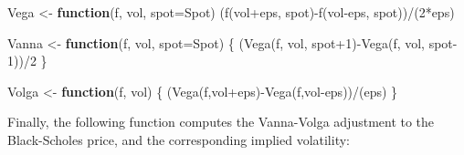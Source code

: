 \documentclass[]{tufte-book}
\newenvironment{Shaded}{}{}
\newcommand{\AttributeTok}[1]{\textcolor[rgb]{0.49,0.56,0.16}{#1}}
\newcommand{\ControlFlowTok}[1]{\textcolor[rgb]{0.00,0.44,0.13}{\textbf{#1}}}
\newcommand{\DecValTok}[1]{\textcolor[rgb]{0.25,0.63,0.44}{#1}}
\newcommand{\FunctionTok}[1]{\textcolor[rgb]{0.02,0.16,0.49}{#1}}
\newcommand{\NormalTok}[1]{#1}
\newcommand{\OtherTok}[1]{\textcolor[rgb]{0.00,0.44,0.13}{#1}}
\newcommand{\SpecialCharTok}[1]{\textcolor[rgb]{0.25,0.44,0.63}{#1}}
\begin{document}
\begin{Shaded}
\begin{Highlighting}[]
\NormalTok{  Vega }\OtherTok{\textless{}{-}} \ControlFlowTok{function}\NormalTok{(f, vol, }\AttributeTok{spot=}\NormalTok{Spot) (}\FunctionTok{f}\NormalTok{(vol}\SpecialCharTok{+}\NormalTok{eps, spot)}\SpecialCharTok{{-}}\FunctionTok{f}\NormalTok{(vol}\SpecialCharTok{{-}}\NormalTok{eps, spot))}\SpecialCharTok{/}\NormalTok{(}\DecValTok{2}\SpecialCharTok{*}\NormalTok{eps)}

\NormalTok{  Vanna }\OtherTok{\textless{}{-}} \ControlFlowTok{function}\NormalTok{(f, vol, }\AttributeTok{spot=}\NormalTok{Spot) \{}
\NormalTok{    (}\FunctionTok{Vega}\NormalTok{(f, vol, spot}\SpecialCharTok{+}\DecValTok{1}\NormalTok{)}\SpecialCharTok{{-}}\FunctionTok{Vega}\NormalTok{(f, vol, spot}\DecValTok{{-}1}\NormalTok{))}\SpecialCharTok{/}\DecValTok{2}
\NormalTok{  \}}

\NormalTok{  Volga }\OtherTok{\textless{}{-}} \ControlFlowTok{function}\NormalTok{(f, vol) \{}
\NormalTok{      (}\FunctionTok{Vega}\NormalTok{(f,vol}\SpecialCharTok{+}\NormalTok{eps)}\SpecialCharTok{{-}}\FunctionTok{Vega}\NormalTok{(f,vol}\SpecialCharTok{{-}}\NormalTok{eps))}\SpecialCharTok{/}\NormalTok{(eps)}
\NormalTok{  \}}
\end{Highlighting}
\end{Shaded}

Finally, the following function computes the Vanna-Volga adjustment to
the Black-Scholes price, and the corresponding implied volatility:
\end{document}

